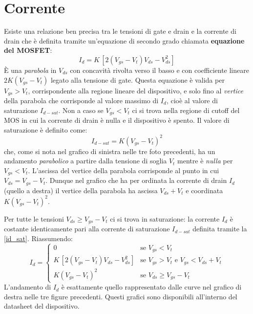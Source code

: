 \documentclass[12pt, a4paper]{report}
\begin{document}
\section{Corrente}
Esiste una relazione ben precisa tra le tensioni di gate e drain e la corrente di drain che è definita tramite un'equazione di secondo grado chiamata \textbf{equazione del MOSFET}:
\begin{equation}
    I_{d} = K\,[2(V_{gs} - V_{t})V_{ds} - V_{ds}^2]
\end{equation}
È una \textit{parabola} in $V_{ds}$ con concavità rivolta verso il basso e con coefficiente lineare $2K(V_{gs} - V_{t})$ legato alla tensione di gate. Questa equazione è valida per $V_{gs} > V_{t}$, corrispondente alla regione lineare del dispositivo, e solo fino al \textit{vertice} della parabola che corrisponde al valore massimo di $I_{d}$, cioè al valore di saturazione $I_{d-sat}$. Non a caso se $V_{gs} < V_{t}$ ci si trova nella regione di cutoff del MOS in cui la corrente di drain è nulla e il dispositivo è spento. Il valore di saturazione è definito come:
\begin{equation}
    I_{d-sat} = K(V_{gs} - V_{t})^2
    \label{id_sat}
\end{equation}
che, come si nota nel grafico di sinistra nelle tre foto precedenti, ha un andamento \textit{parabolico} a partire dalla tensione di soglia $V_t$ mentre è \textit{nulla} per $V_{gs} < V_{t}$. L'ascissa del vertice della parabola corrisponde al punto in cui $V_{ds} = V_{gs} - V_{t}$. Dunque nel grafico che ha per ordinata la corrente di drain $I_{d}$ (quello a destra) il vertice della parabola ha ascissa $V_{ds} + V_{t}$ e coordinata $K(V_{gs} - V_{t})^2$.

Per tutte le tensioni $V_{ds} \geq V_{gs} - V_{t}$ ci si trova in saturazione: la corrente $I_{d}$ è costante identicamente pari alla corrente di saturazione $I_{d-sat}$ definita tramite la \eqref{id_sat}. Riassumendo:
\begin{equation*}
I_{d} = \left\{
\begin{array}{ll}
0 &\text{se } V_{gs} < V_{t}\\
K\,[2(V_{gs} - V_{t})V_{ds} - V_{ds}^2] &\text{se } V_{gs} > V_{t} \text{ e } V_{gs} < V_{ds} + V_{t}\\
K(V_{gs} - V_{t})^2 & \text{se } V_{ds} \geq V_{gs} - V_{t} 
\end{array}\right.
\end{equation*}
L'andamento di $I_{d}$ è esattamente quello rappresentato dalle curve nel grafico di destra nelle tre figure precedenti. Questi grafici sono disponibili all'interno del datasheet del dispositivo.
\end{document}
